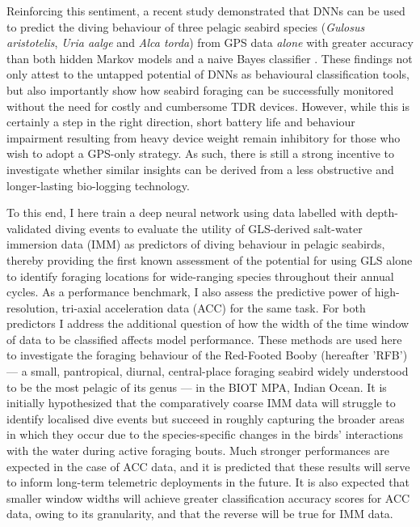 \documentclass[11pt]{article}
\begin{document}
    Reinforcing this sentiment, a recent study demonstrated that DNNs can be used to predict the diving behaviour of three pelagic seabird species (\emph{Gulosus aristotelis}, \emph{Uria aalge} and \emph{Alca torda}) from GPS data \emph{alone} with greater accuracy than both hidden Markov models and a naive Bayes classifier \citep{browning2018predicting}. These findings not only attest to the untapped potential of DNNs as behavioural classification tools, but also importantly 
    show how seabird foraging can be successfully monitored without the need for costly and cumbersome TDR devices. However, while this is certainly a step in the right direction, short battery life and behaviour impairment resulting from heavy device weight remain inhibitory for those who wish to adopt a GPS-only strategy. As such, there is still a strong incentive to investigate whether similar insights can be derived from a less obstructive and longer-lasting bio-logging technology. 
    
    To this end, I here train a deep neural network using data labelled with depth-validated diving events to evaluate the utility of GLS-derived salt-water immersion data (IMM) as predictors of diving behaviour in pelagic seabirds, thereby providing the first known assessment of the potential for using GLS alone to identify foraging locations for wide-ranging species throughout their annual cycles. As a performance benchmark, I also assess the predictive power of high-resolution, tri-axial acceleration data (ACC) for the same task. For both predictors I address the additional question of how the width of the time window of data to be classified affects model performance. These methods are used here to investigate the foraging behaviour of the Red-Footed Booby (hereafter 'RFB') — a small, pantropical, diurnal, central-place foraging seabird widely understood to be the most pelagic of its genus \citep{nelson1978sulidae,schreiber1996red} — in the BIOT MPA, Indian Ocean. It is initially hypothesized that the comparatively coarse IMM data will struggle to identify localised dive events but succeed in roughly capturing the broader areas in which they occur due to the species-specific changes in the birds' interactions with the water during active foraging bouts. Much stronger performances are expected in the case of ACC data, and it is predicted that these results will serve to inform long-term telemetric deployments in the future. It is also expected that smaller window widths will achieve greater classification accuracy scores for ACC data, owing to its granularity, and that the reverse will be true for IMM data.
    
\end{document}

